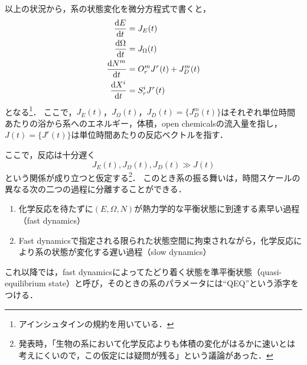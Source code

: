 \documentclass[a4paper,11pt]{jsarticle}
\theoremstyle{definition}
\begin{document}
以上の状況から，系の状態変化を微分方程式で書くと，
\begin{align}
  \dv{E}{t} &= J_{E}(t) \\
  \dv{\Omega}{t} &= J_{\Omega}(t) \\
  \dv{N^m}{t} &= O^m_r J^r(t) + J^m_{D}(t) \\
  \dv{X^i}{t} &= S^i_r J^r(t)
\end{align}
となる\footnote{アインシュタインの規約を用いている．}．
ここで，$J_{E}(t)$，$J_{\Omega}(t)$，$J_{D}(t)=\{ J^m_{D}(t) \}$はそれぞれ単位時間あたりの浴から系へのエネルギー，体積，open chemicalsの流入量を指し，$J(t) = \{ J^r(t) \}$は単位時間あたりの反応ベクトルを指す．

ここで，反応は十分遅く
\begin{equation}
  J_{E}(t), J_{\Omega}(t), J_{D}(t) \gg J(t)
\end{equation}
という関係が成り立つと仮定する\footnote{発表時，「生物の系において化学反応よりも体積の変化がはるかに速いとは考えにくいので，この仮定には疑問が残る」という議論があった．}．
このとき系の振る舞いは，時間スケールの異なる次の二つの過程に分離することができる．
\begin{enumerate}
  \item 化学反応を待たずに$(E,\Omega,N)$が熱力学的な平衡状態に到達する素早い過程（fast dynamics）
  \item Fast dynamicsで指定される限られた状態空間に拘束されながら，化学反応により系の状態が変化する遅い過程（slow dynamics）
\end{enumerate}

これ以降では，fast dynamicsによってたどり着く状態を準平衡状態（quasi-equilibrium state）と呼び，そのときの系のパラメータには``QEQ''という添字をつける．
\end{document}
